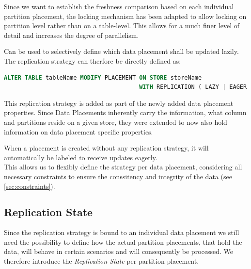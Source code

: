 
Since we want to establish the freshness comparison based on each individual partition placement, the locking mechanism
has been adapted to allow locking on partition level rather than on a table-level. 
This allows for a much finer level of detail and increases the degree of parallelism. 

Can be used to selectively define which data placement shall be updated lazily.
The replication strategy can therfore be directly defined as:
\begin{lstlisting}[language=sql, caption={SQL Stateemnt Syntax to modify the designated Replication Strategy for a Data Placement}]
ALTER TABLE tableName MODIFY PLACEMENT ON STORE storeName 
                                       WITH REPLICATION ( LAZY | EAGER );
\end{lstlisting}

This replication strategy is added as part of the newly added data placement properties. Since Data Placements inherently carry the information, what column and partitions reside
on a given store, they were extended to now also hold information on data placement specific properties.

When a placement is created without any replication strategy, it will automatically be labeled to receive updates eagerly.\\
This allows us to flexibly define the strategy per data placement, considering all necessary constraints to ensure the conssitency and integrity of the data (see \ref{sec:constraints}).




\subsection{Replication State}
\label{sec:states}

Since the replication strategy is bound to an individual data placement we still need the possibility to 
define how the actual partition placements, that hold the data, will behave in certain scenarios and will consequently be processed.
We therefore introduce the \emph{Replication State} per partition placement.\\

